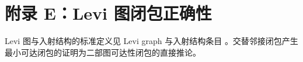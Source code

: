 \section{附录 E：Levi 图闭包正确性}
\label{app:levi-closure}

Levi 图与入射结构的标准定义见 Levi graph 与入射结构条目 \cite{WikipediaLeviGraph}。交替邻接闭包产生最小可达闭包的证明为二部图可达性闭包的直接推论。

